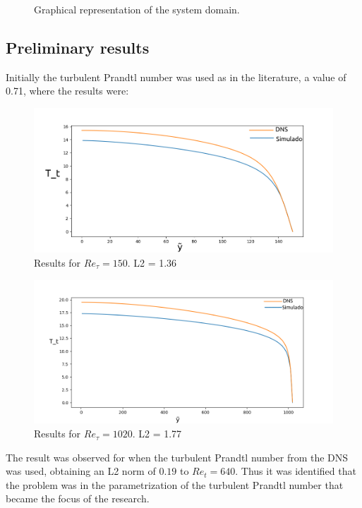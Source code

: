 \documentclass[10pt]{article} %
\begin{document}
\begin{figure}[!h]
	\caption{Graphical representation of the system domain.}
	\label{sistema}
\end{figure}

\subsection{Preliminary results}
Initially the turbulent Prandtl number was used as in the literature, a value of 0.71, where the results were:\\
	\begin{figure}[!h]
		\centering
		\includegraphics[angle=0, scale=0.24]{150orto}
		\caption{Results for $Re_\tau = 150$. L2 = 1.36 }
	\end{figure}
	\begin{figure}[!h]
		\centering
		\includegraphics[angle=0, scale=0.24]{1020orto}
		\caption{Results for $Re_\tau = 1020$. L2 = 1.77}
	\end{figure}	

The result was observed for when the turbulent Prandtl number from the DNS was used, obtaining an L2 norm of $ 0.19 $ to $ Re_t = 640 $. Thus it was identified that the problem was in the parametrization of the turbulent Prandtl number that became the focus of the research.
\end{document}
